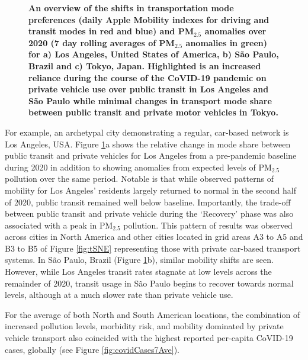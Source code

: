 \documentclass[preprint,10pt]{elsarticle} %
\begin{document}
\begin{figure}
         \label{fig:Tokyo}
        \caption{\bf An overview of the shifts in transportation mode preferences (daily Apple Mobility indexes for driving and transit modes in red and blue) and PM$_{2.5}$ anomalies over 2020 (7 day rolling averages of PM$_{2.5}$ anomalies in green) for a) Los Angeles, United States of America, b) S\~ao Paulo, Brazil and c) Tokyo, Japan. Highlighted is an increased reliance during the course of the CoVID-19 pandemic on private vehicle use over public transit in Los Angeles and S\~ao Paulo while minimal changes in transport mode share between public transit and private motor vehicles in Tokyo.}
        \label{fig:three_graphs_Driv_trans}
\end{figure}

For example, an archetypal city demonstrating a regular, car-based network is Los Angeles, USA. Figure \ref{fig:three_graphs_Driv_trans}a shows the relative change in mode share between public transit and private vehicles for Los Angeles from a pre-pandemic baseline during 2020 in addition to showing anomalies from expected levels of PM$_{2.5}$ pollution over the same period. Notable is that while observed patterns of mobility for Los Angeles' residents largely returned to normal in the second half of 2020, public transit remained well below baseline. Importantly, the trade-off between public transit and private vehicle during the `Recovery' phase was also associated with a peak in PM$_{2.5}$ pollution. This pattern of results was observed across cities in North America and other cities located in grid areas A3 to A5 and B3 to B5 of Figure \ref{fig:tSNE} representing those with private car-based transport systems. In S\~ao Paulo, Brazil (Figure \ref{fig:three_graphs_Driv_trans}b), similar mobility shifts are seen. However, while Los Angeles transit rates stagnate at low levels across the remainder of 2020, transit usage in S\~ao Paulo begins to recover towards normal levels, although at a much slower rate than private vehicle use.

For the average of both North and South American locations, the combination of increased pollution levels, morbidity risk, and mobility dominated by private vehicle transport also coincided with the highest reported per-capita CoVID-19 cases, globally (see Figure \ref{fig:covidCases7Ave}). 
\end{document}
